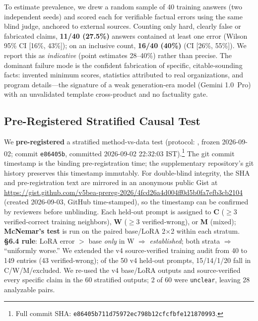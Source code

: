 \documentclass[11pt]{article}
\begin{document}
To estimate prevalence, we drew a random sample of 40 training answers (two independent seeds) and scored each for verifiable factual errors using the same blind judge, anchored to external sources. Counting only hard, clearly false or fabricated claims, \textbf{11/40 (27.5\%)} answers contained at least one error (Wilson 95\% CI [16\%, 43\%]); on an inclusive count, \textbf{16/40 (40\%)} (CI [26\%, 55\%]). We report this as \emph{indicative} (point estimates 28--40\%) rather than precise. The dominant failure mode is the confident fabrication of specific, citable-sounding facts: invented minimum scores, statistics attributed to real organizations, and program details---the signature of a weak generation-era model (Gemini 1.0~Pro) with an unvalidated template cross-product and no factuality gate.

\subsection{Pre-Registered Stratified Causal Test}\label{sec:v4.5}

\begin{sloppypar}
We \textbf{pre-registered} a stratified method-vs-data test (protocol: , frozen 2026-09-02; commit \texttt{e86405b}, committed 2026-09-02 22:32:03 IST).\footnote{\tiny Full commit SHA: \texttt{e86405b711d75972ec798b12cfcfbfe121870993}.} The git commit timestamp is the binding pre-registration time; the supplementary repository's git history preserves this timestamp immutably. For double-blind integrity, the SHA and pre-registration text are mirrored in an anonymous public Gist at \url{https://gist.github.com/v5bea-prereg-2026/4fcd26a4d004ff0d5b0fa7efb3cb2104} (created 2026-09-03, GitHub time-stamped), so the timestamp can be confirmed by reviewers before unblinding. Each held-out prompt is assigned to \textbf{C} ($\ge$3 verified-correct training neighbors), \textbf{W} ($\ge$3 verified-wrong), or \textbf{M} (mixed); \textbf{McNemar's test} is run on the paired base/LoRA 2$\times$2 within each stratum. \textbf{§6.4 rule}: LoRA error $>$ base \emph{only} in W $\Rightarrow$ \emph{established}; both strata $\Rightarrow$ ``uniformly worse.'' We extended the v4 source-verified training audit from 40 to 149 entries (43 verified-wrong); of the 50 v4 held-out prompts, 15/14/1/20 fall in C/W/M/excluded. We re-used the v4 base/LoRA outputs and source-verified every specific claim in the 60 stratified outputs; 2 of 60 were \texttt{unclear}, leaving 28 analyzable pairs.
\end{sloppypar}
\end{document}

